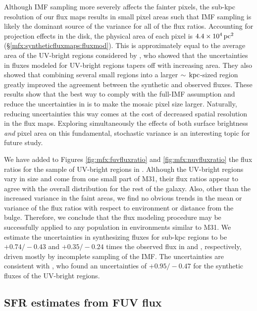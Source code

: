 Although IMF sampling more severely affects the fainter pixels, the sub-kpc
resolution of our flux maps results in small pixel areas such that IMF sampling
is likely the dominant source of the variance for all of the flux ratios.
Accounting for projection effects in the disk, the physical area of each pixel
is $4.4\times 10^4\,\mathrm{pc}^2$ (\S \ref{mfx:syntheticfluxmaps:fluxmod}). This is
approximately equal to the average area of the UV-bright regions considered by
\citet{Simones:2014}, who showed that the uncertainties in fluxes modeled for
UV-bright regions tapers off with increasing area. They also showed that
combining several small regions into a larger $\sim\,\mathrm{kpc}$-sized region greatly
improved the agreement between the synthetic and observed fluxes. These results
show that the best way to comply with the full-IMF assumption and reduce the
uncertainties in \fxsfh{} is to make the mosaic pixel size larger. Naturally,
reducing uncertainties this way comes at the cost of decreased spatial
resolution in the flux maps. Exploring simultaneously the effects of both
surface brightness \emph{and} pixel area on this fundamental, stochastic
variance is an interesting topic for future study.

We have added to Figures \ref{fig:mfx:fuvfluxratio} and
\ref{fig:mfx:nuvfluxratio} the flux ratios for the sample of UV-bright regions
in \citet{Simones:2014}. Although the UV-bright regions vary in size and come
from one small part of M31, their flux ratios appear to agree with the overall
distribution for the rest of the galaxy. Also, other than the increased
variance in the faint areas, we find no obvious trends in the mean or variance
of the flux ratios with respect to environment or distance from the bulge.
Therefore, we conclude that the flux modeling procedure may be successfully
applied to any population in environments similar to M31. We estimate the
uncertainties in synthesizing fluxes for sub-kpc regions to be $+\!0.74/\!-\!0.43$
and $+\!0.35/\!-\!0.24$ times the observed flux in \fuv{} and \nuv{}, respectively,
driven mostly by incomplete sampling of the IMF. The \ffuvsfh{} uncertainties
are consistent with \citet{Simones:2014}, who found an uncertainties of
$+\!0.95/\!-\!0.47$ for the synthetic \fuv{} fluxes of the UV-bright regions.



\subsection{SFR estimates from FUV flux}

